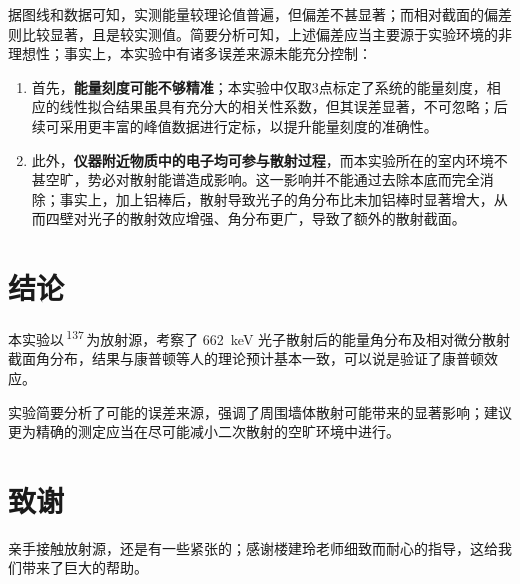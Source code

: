 \documentclass[aps,pre,12pt,preprint,%
	onecolumn,showpacs,showkeys,nofootinbib]{revtex4-1}
\newcommand{\CsAtom}{\,\textsuperscript{137}\tup{Cs}\,}
\begin{document}
	据图线和数据可知，实测能量较理论值普遍，但偏差不甚显著；而相对截面的偏差则比较显著，且是较实测值。简要分析可知，上述偏差应当主要源于实验环境的非理想性；事实上，本实验中有诸多误差来源未能充分控制：
	\begin{enumerate}
	\item 首先，\textbf{能量刻度可能不够精准}；本实验中仅取3点标定了系统的能量刻度，相应的线性拟合结果虽具有充分大的相关性系数，但其误差显著，不可忽略；后续可采用更丰富的峰值数据进行定标，以提升能量刻度的准确性。
	\item 此外，\textbf{仪器附近物质中的电子均可参与散射过程}，而本实验所在的室内环境不甚空旷，势必对散射能谱造成影响。这一影响并不能通过去除本底而完全消除；事实上，加上铝棒后，散射导致光子的角分布比未加铝棒时显著增大，从而四壁对光子的散射效应增强、角分布更广，导致了额外的散射截面。
	\end{enumerate}
\section{结论}
	本实验以\CsAtom 为放射源，考察了 \SI{662}{\keV} 光子散射后的能量角分布及相对微分散射截面角分布，结果与康普顿等人的理论预计基本一致，可以说是验证了康普顿效应。
	
	实验简要分析了可能的误差来源，强调了周围墙体散射可能带来的显著影响；建议更为精确的测定应当在尽可能减小二次散射的空旷环境中进行。
\section{致谢}
	亲手接触放射源，还是有一些紧张的；感谢楼建玲老师细致而耐心的指导，这给我们带来了巨大的帮助。
\clearpage

\setlength{\bibsep}{2pt}
\linespread{1.2}\selectfont



\clearpage
\end{document}
